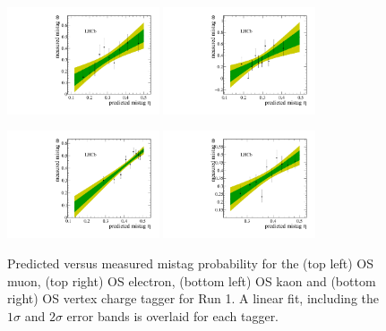 \begin{figure}[h]
\centering
\includegraphics[height=!,width=0.4\textwidth]{figs/Tagging/Run1/OS_Muon_Calibration.pdf}
\includegraphics[height=!,width=0.4\textwidth]{figs/Tagging/Run1/OS_Electron_Calibration.pdf}

\includegraphics[height=!,width=0.4\textwidth]{figs/Tagging/Run1/OS_nnetKaon_Calibration.pdf}
\includegraphics[height=!,width=0.4\textwidth]{figs/Tagging/Run1/VtxCharge_Calibration.pdf}
\caption{Predicted versus measured mistag probability for the (top left) OS muon, (top right) OS electron, (bottom left) OS kaon and (bottom right) OS vertex charge tagger for Run 1. 
A linear fit, including the $1\sigma$ and $2\sigma$ error bands is overlaid for each tagger.}
\label{fig:OSdistribution_Run1}
\end{figure}

